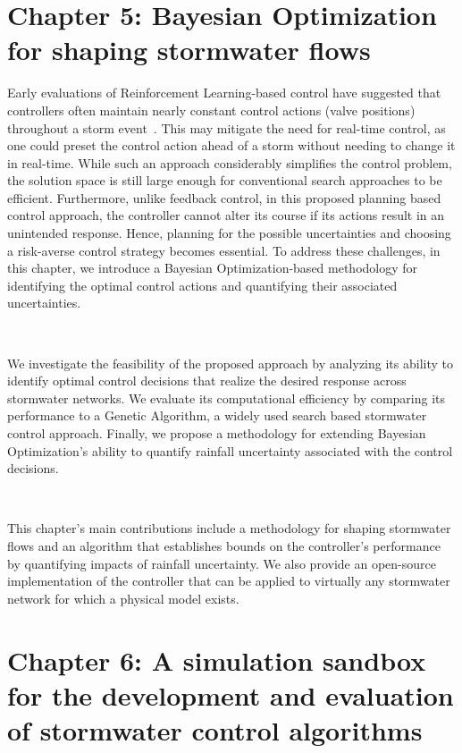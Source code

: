 \section{Chapter 5: Bayesian Optimization for shaping stormwater flows}

Early evaluations of Reinforcement Learning-based control have suggested that controllers often maintain nearly constant control actions (valve positions) throughout a storm event~\cite{Mullapudi_Lewis_Gruden_Kerkez_2020}.
This may mitigate the need for real-time control, as one could preset the control action ahead of a storm without needing to change it in real-time. 
While such an approach considerably simplifies the control problem, the solution space is still large enough for conventional search approaches to be efficient.
Furthermore, unlike feedback control, in this proposed planning based control approach, the controller cannot alter its course if its actions result in an unintended response. 
Hence, planning for the possible uncertainties and choosing a risk-averse control strategy becomes essential.
To address these challenges, in this chapter, we introduce a Bayesian Optimization-based methodology for identifying the optimal control actions and quantifying their associated uncertainties.

\

We investigate the feasibility of the proposed approach by analyzing its ability to identify optimal control decisions that realize the desired response across stormwater networks.
We evaluate its computational efficiency by comparing its performance to a Genetic Algorithm, a widely used search based stormwater control approach.
Finally, we propose a methodology for extending Bayesian Optimization's ability to quantify rainfall uncertainty associated with the control decisions.

\

This chapter's main contributions include a methodology for shaping stormwater flows and an algorithm that establishes bounds on the controller's performance by quantifying impacts of rainfall uncertainty.
We also provide an open-source implementation of the controller that can be applied to virtually any stormwater network for which a physical model exists.

\section[\texttt{Chapter 6: pystorms}]{Chapter 6: A simulation sandbox for the development and evaluation of stormwater control algorithms}

